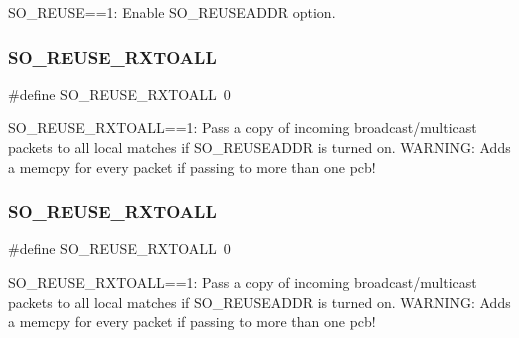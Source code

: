 S\+O\+\_\+\+R\+E\+U\+SE==1\+: Enable S\+O\+\_\+\+R\+E\+U\+S\+E\+A\+D\+DR option. \mbox{\label{group__lwip__opts__socket_gae9395d83af89002343e5782130f52f44}} 
\subsubsection{\texorpdfstring{S\+O\+\_\+\+R\+E\+U\+S\+E\+\_\+\+R\+X\+T\+O\+A\+LL}{SO\_REUSE\_RXTOALL}\hspace{0.1cm}{\footnotesize\ttfamily [1/2]}}
{\footnotesize\ttfamily \#define S\+O\+\_\+\+R\+E\+U\+S\+E\+\_\+\+R\+X\+T\+O\+A\+LL~0}

S\+O\+\_\+\+R\+E\+U\+S\+E\+\_\+\+R\+X\+T\+O\+A\+LL==1\+: Pass a copy of incoming broadcast/multicast packets to all local matches if S\+O\+\_\+\+R\+E\+U\+S\+E\+A\+D\+DR is turned on. W\+A\+R\+N\+I\+NG\+: Adds a memcpy for every packet if passing to more than one pcb! \mbox{\label{group__lwip__opts__socket_gae9395d83af89002343e5782130f52f44}} 
\subsubsection{\texorpdfstring{S\+O\+\_\+\+R\+E\+U\+S\+E\+\_\+\+R\+X\+T\+O\+A\+LL}{SO\_REUSE\_RXTOALL}\hspace{0.1cm}{\footnotesize\ttfamily [2/2]}}
{\footnotesize\ttfamily \#define S\+O\+\_\+\+R\+E\+U\+S\+E\+\_\+\+R\+X\+T\+O\+A\+LL~0}

S\+O\+\_\+\+R\+E\+U\+S\+E\+\_\+\+R\+X\+T\+O\+A\+LL==1\+: Pass a copy of incoming broadcast/multicast packets to all local matches if S\+O\+\_\+\+R\+E\+U\+S\+E\+A\+D\+DR is turned on. W\+A\+R\+N\+I\+NG\+: Adds a memcpy for every packet if passing to more than one pcb! 